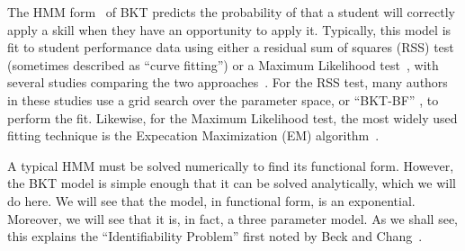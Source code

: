 \documentclass{acmlarge-edm}
\begin{document}
The HMM form~\cite{beck_identifiability:_2007} of BKT 
predicts the probability of that a student will 
correctly apply a skill when they have an opportunity to apply it.
%
%
%
%
%
%
Typically, this model is fit to student performance data 
using either a residual sum of squares (RSS)
test (sometimes described as ``curve fitting'')
\cite{corbett_knowledge_1995} or a Maximum Likelihood
test~\cite{pardos_navigating_2010}, with several studies comparing the two
approaches~\cite{baker_ensembling_2011,chang_bayes_2006,pardos_ensembling_2011,pardos_sum_2012}.
For the RSS test, many authors in these studies use a grid search
over the parameter space, or ``BKT-BF'' \cite{baker_ensembling_2011}, to perform the fit.  
Likewise, for the Maximum Likelihood test, the most widely used
fitting technique is the Expecation Maximization (EM)
algorithm~\cite{dempster_maximum_1977,chang_bayes_2006}. 

A typical HMM must be solved numerically to find its functional form.
However, the BKT model is simple enough that it can be 
solved analytically, which we will do here.  We will see that the model, 
in functional form, is an exponential.  Moreover, we will see that 
it is, in fact, a three parameter model.  As we shall see, 
this explains the ``Identifiability Problem'' first noted by 
Beck and Chang~\citeyear{beck_identifiability:_2007}.
\end{document}
